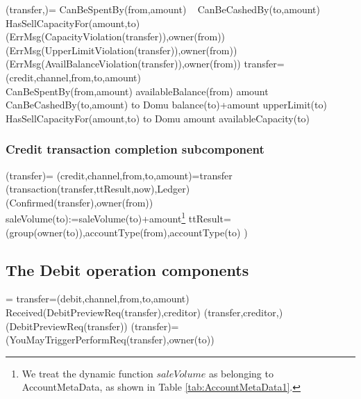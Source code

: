  \begin{asm}
 (transfer,)=\+
 \IF CanBeSpentBy(from,amount) \+
 \THEN ~ \IF CanBeCashedBy(to,amount) \+
 \THEN ~ \IF HasSellCapacityFor(amount,to) \+
 \THEN ~  \-
 \ELSE 
 ~ (ErrMsg(CapacityViolation(transfer)),\TO owner(from))\-
 \ELSE 
 ~ (ErrMsg(UpperLimitViolation(transfer)),\TO owner(from))\-
 \ELSE 
 ~ (ErrMsg(AvailBalanceViolation(transfer)),\TO owner(from))\-
 \WHERE \+
 transfer=(credit,channel,from,to,amount)\\
 CanBeSpentBy(from,amount) \IFF availableBalance(from) \geq amount \\
 CanBeCashedBy(to,amount) \IFF  
 to \not \in Domu \AND balance(to)+amount \leq upperLimit(to) \\
 HasSellCapacityFor(amount,to) \IFF  to \not \in Domu \AND   amount \leq availableCapacity(to)
 \end{asm}

 \subsubsection{Credit transaction completion subcomponent}
 \begin{asm}
 	(transfer)=\+  
 	\LET (credit,channel,from,to,amount)=transfer \\ 
 	(transaction(transfer,ttResult,now),Ledger)\\
 	(Confirmed(transfer),\TO owner(from))\\
 	saleVolume(to):=saleVolume(to)+amount\footnote{We treat the dynamic function $saleVolume$ as belonging to AccountMetaData, as shown in Table \ref{tab:AccountMetaData1}.} \-
 	\WHERE \+
 	ttResult= (group(owner(to)),accountType(from),accountType(to) )
 \end{asm}
 
 \subsection{The Debit operation components}
 

\begin{asm}
	  =\+
	\LET transfer=(debit,channel,from,to,amount)\\
	\IF Received(DebitPreviewReq(transfer),\FROM creditor) \THEN \+   
	(transfer,creditor,)\\
	(DebitPreviewReq(transfer)) \dec\-
	\WHERE \+
	(transfer)=\+
	  (YouMayTriggerPerformReq(transfer),\TO  owner(to)) 
\end{asm}
 

